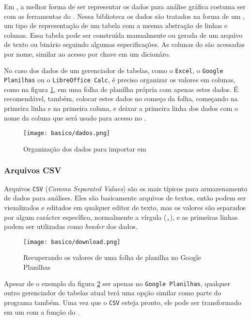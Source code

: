 Em \python, a melhor forma de ser representar os dados para análise gráfica costuma ser com as ferramentas do \pandas. Nessa biblioteca os dados são tratados na forma de um \dataframe, um tipo de representação de um tabela com a mesma abstração de linhas e colunas. Essa tabela pode ser construída manualmente ou gerada de um arquivo de texto ou binário seguindo algumas especificações. As colunas do \dataframe são acessadas por nome, similar ao acesso por chave em um dicionáro.

No caso dos dados de um gerenciador de tabelas, como o \texttt{Excel}, o \texttt{Google Planilhas} ou o \texttt{LibreOffice Calc}, é preciso organizar os valores em colunas, como na figura \ref{fig:basico:dados}, em uma folha de planilha própria com apenas estes dados. É recomendável, também, colocar estes dados no começo da folha, começando na primeira linha e na primeira coluna, e deixar a primeira linha dos dados com o nome da coluna que será usado para acesso no \dataframe.

\begin{figure}[H]
    \centering
    \texttt{[image: basico/dados.png]}

    \caption{Organização dos dados para importar em \python}
    \label{fig:basico:dados}
\end{figure}


\subsubsection{Arquivos CSV}

    Arquivos \texttt{CSV} (\textit{Comma Separated Values}) são os mais típicos para armazenamento de dados para análises. Eles são basicamente arquivos de textos, então podem ser visualizados e editados em qualquer editor de texto, mas os valores são separados por algum carácter específico, normalmente a vírgula (\texttt{,}), e as primeiras linhas podem ser utilizadas como \textit{header} dos dados.

    \begin{figure}[H]
        \centering
        \texttt{[image: basico/download.png]}

        \caption{Recuperando os valores de uma folha de planilha no Google Planilhas}
        \label{fig:basico:download}
    \end{figure}

    Apesar de o exemplo da figura \ref{fig:basico:download} ser apenas no \texttt{Google Planilhas}, qualquer outro gerenciador de tabelas atual terá uma opção similar como parte do programa também. Uma vez que o \texttt{CSV} esteja pronto, ele pode ser transformado em um \dataframe com a função \href{http://pandas.pydata.org/pandas-docs/stable/reference/api/pandas.read_csv.html#pandas.read_csv}{} do \pandas.

